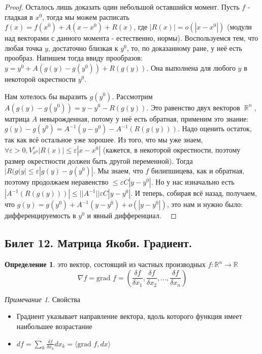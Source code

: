 \documentclass[a4paper]{article}
\theoremstyle{indented}
\theoremstyle{definition}
\newtheorem{defn}{Определение}
\theoremstyle{remark}
\newtheorem{remark}{Примечание}
\DeclareMathOperator{\RR}{\mathbb{R}}
\begin{document}
\begin{proof}
    Осталось лишь доказать один небольшой оставшийся момент. Пусть $f$ - гладкая в $x^0$, тогда мы можем расписать $f(x)=f(x^0)+A(x-x^0)+R(x)$, где $|R(x)|=o(|x-x^0|)$ (модули над векторами с данного момента - естественно, нормы). Воспользуемся тем, что любая точка $y$, достаточно близкая к $y^0$, то, по доказанному ране, у неё есть прообраз. Напишем тогда ввиду прообразов: $y=y^0+A(g(y)-g(y^0))+R(g(y))$. Она выполнена для любого $y$ в некоторой окрестности $y^0$. \ 

    Нам хотелось бы выразить $g(y^0)$. Рассмотрим $A(g(y)-g(y^0))=y-y^0-R(g(y))$. Это равенство двух векторов $\RR^n$, матрица $A$ невырожденная, потому у неё есть обратная, применим это знание: $g(y)-g(y^0)=A^{-1}(y-y^0)-A^{-1}(R(g(y)))$. Надо оценить остаток, так как всё остальное уже хорошее. Из того, что мы уже знаем, $\forall \varepsilon>0, V_{x^0}^\varepsilon |R(x)|\leq \varepsilon |x-x^0|$ (кажется, в некоторой окрестности, поэтому размер окрестности должен быть другой переменной). Тогда $|R(g(y|\leq \varepsilon |g(y)-g(y^0)|$. Мы знаем, что $f$ билипшицева, как и обратная, поэтому продолжаем неравенство $\leq \varepsilon C |y-y^0|$. Но у нас изначально есть $|A^{-1}(R(g(y)))|\leq ||A^{-1}||\varepsilon C |y-y^0|$. И теперь, собирая всё назад, получаем, что $g(y)=g(y^0)+A^{-1}(y-y^0)+o(|y-y^0|)$, это нам и нужно было: дифференцируемость в $y^0$ и явный дифференциал. \ 

\end{proof}

\subsection{Билет 12. Матрица Якоби. Градиент.}


\begin{defn}
     это вектор, состоящий из частных производных $f: \mathbb{R}^n \to \mathbb{R}$
    \[
        \nabla f = \textrm{grad } f =
        \left(\frac{\delta f}{\delta x_1}, \frac{\delta f}{\delta x_2}, ... , \frac{\delta f}{\delta x_n} \right)
    \]
\end{defn}

\begin{remark} Свойства
    \begin{itemize}
        \item Градиент указывает направление вектора, вдоль которого функция имеет наибольшее возрастание
        \item $df = \sum\limits_{k}^{} \frac{\delta f}{\delta x_k} dx_k = \langle \textrm{grad } f, dx \rangle$
    \end{itemize}
\end{remark}
\end{document}
